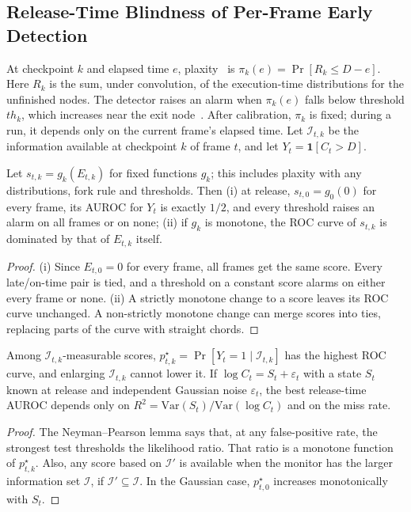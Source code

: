 \documentclass[acmsmall,screen]{acmart}
\begin{document}
\subsection{Release-Time Blindness of Per-Frame Early Detection}\label{sec:blind}

At checkpoint $k$ and elapsed time $e$, plaxity~\cite{toba2024,toba2026} is $\pi_k(e)=\Pr[R_k\le D-e]$. Here $R_k$ is the sum, under convolution, of the execution-time distributions for the unfinished nodes. The detector raises an alarm when $\pi_k(e)$ falls below threshold $th_k$, which increases near the exit node~\cite{toba2026}. After calibration, $\pi_k$ is fixed; during a run, it depends only on the current frame's elapsed time. Let $\mathcal I_{t,k}$ be the information available at checkpoint $k$ of frame $t$, and let $Y_t=\mathbf 1[C_t>D]$.

\begin{theorem}\label{thm:blind}
Let $s_{t,k}=g_k(E_{t,k})$ for fixed functions $g_k$; this includes plaxity with any distributions, fork rule and thresholds. Then
(i) at release, $s_{t,0}=g_0(0)$ for every frame, its AUROC for $Y_t$ is exactly $1/2$, and every threshold raises an alarm on all frames
or on none; (ii) if $g_k$ is monotone, the ROC curve of $s_{t,k}$ is dominated by that of $E_{t,k}$ itself.
\end{theorem}
\begin{proof}
(i) Since $E_{t,0}=0$ for every frame, all frames get the same score. Every late/on-time pair is tied, and a threshold on a constant score alarms on either every frame or none. (ii) A strictly monotone change to a score leaves its ROC curve unchanged. A non-strictly monotone change can merge scores into ties, replacing parts of the curve with straight chords.
\end{proof}

\begin{proposition}\label{prop:limit}
Among $\mathcal I_{t,k}$-measurable scores, $p^\star_{t,k}=\Pr[Y_t=1\mid\mathcal I_{t,k}]$ has the highest ROC curve, and enlarging
$\mathcal I_{t,k}$ cannot lower it. If $\log C_t=S_t+\varepsilon_t$ with a state $S_t$ known at release and independent Gaussian noise
$\varepsilon_t$, the best release-time AUROC depends only on $R^2=\mathrm{Var}(S_t)/\mathrm{Var}(\log C_t)$ and on the miss rate.
\end{proposition}
\begin{proof}
The Neyman--Pearson lemma says that, at any false-positive rate, the strongest test thresholds the likelihood ratio. That ratio is a monotone function of $p^\star_{t,k}$. Also, any score based on $\mathcal I'$ is available when the monitor has the larger information set $\mathcal I$, if $\mathcal I'\subseteq\mathcal I$. In the Gaussian case, $p^\star_{t,0}$ increases monotonically with $S_t$.
\end{proof}
\end{document}
